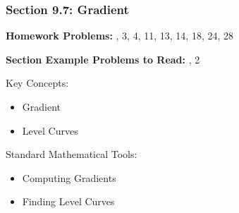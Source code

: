 %
% 

\begin{frame}
\frametitle{\Large {\color[rgb]{0.02,0.20,1.0} Section 9.7: Gradient}}
\scriptsize

\vspace{0.2cm}
{\bf Homework Problems:} , 3, 4, 11, 13, 14, 18, 24, 28

\vspace{0.2cm}

{\bf Section Example Problems to Read:} , 2

\vspace{0.4cm}

\begin{block}{Key Concepts:}
\begin{itemize}
	\item[...] Gradient
	\item[...] Level Curves
\end{itemize}
\end{block}

\begin{block}{Standard Mathematical Tools:}
\begin{itemize}
	\item[...] Computing Gradients
	\item[...] Finding Level Curves
\end{itemize}
\end{block}

\vspace{2.0cm}
\end{frame}

